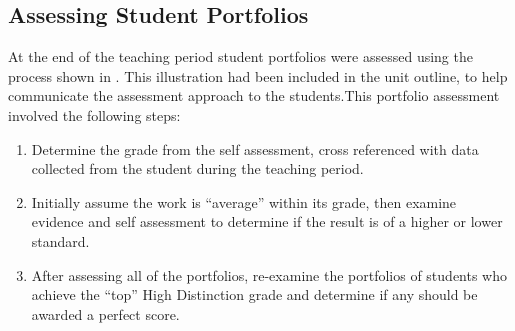 

\subsection{Assessing Student Portfolios} %
\label{sub:assessing_student_portfolios}

At the end of the teaching period student portfolios were assessed using the process shown in . This illustration had been included in the unit outline, to help communicate the assessment approach to the students.This portfolio assessment involved the following steps:

\begin{enumerate}
	\item Determine the grade from the self assessment, cross referenced with data collected from the student during the teaching period.
	\item Initially assume the work is ``average'' within its grade, then examine evidence and self assessment to determine if the result is of a higher or lower standard.
	\item After assessing all of the portfolios, re-examine the portfolios of students who achieve the ``top'' High Distinction grade and determine if any should be awarded a perfect score.
\end{enumerate}

